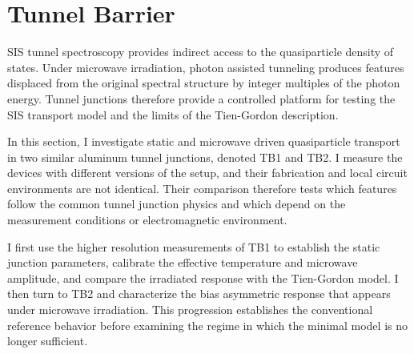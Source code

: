\section{Tunnel Barrier}
\label{sec:tunnelbarrier}

    SIS tunnel spectroscopy provides indirect access to the quasiparticle density of states. Under microwave irradiation, photon assisted tunneling produces features displaced from the original spectral structure by integer multiples of the photon energy. Tunnel junctions therefore provide a controlled platform for testing the SIS transport model and the limits of the Tien-Gordon description.

    In this section, I investigate static and microwave driven quasiparticle transport in two similar aluminum tunnel junctions, denoted TB1 and TB2. I measure the devices with different versions of the setup, and their fabrication and local circuit environments are not identical. Their comparison therefore tests which features follow the common tunnel junction physics and which depend on the measurement conditions or electromagnetic environment.

    I first use the higher resolution measurements of TB1 to establish the static junction parameters, calibrate the effective temperature and microwave amplitude, and compare the irradiated response with the Tien-Gordon model. I then turn to TB2 and characterize the bias asymmetric response that appears under microwave irradiation. This progression establishes the conventional reference behavior before examining the regime in which the minimal model is no longer sufficient.

